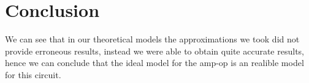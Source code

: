 \section{Conclusion}
\label{sec:conclusion}
We can see that in our theoretical models the approximations we took did not provide erroneous results, instead we were able to obtain quite accurate results, hence we can conclude that the ideal model for the amp-op is an realible model for this circuit. 
